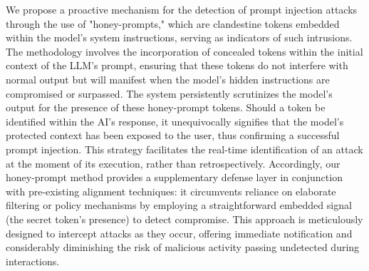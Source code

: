 \documentclass[manuscript,screen,review]{acmart}
\begin{document}
We propose a proactive mechanism for the detection of prompt injection attacks through the use of "honey-prompts," which are clandestine tokens embedded within the model's system instructions, serving as indicators of such intrusions. The methodology involves the incorporation of concealed tokens within the initial context of the LLM's prompt, ensuring that these tokens do not interfere with normal output but will manifest when the model's hidden instructions are compromised or surpassed. The system persistently scrutinizes the model's output for the presence of these honey-prompt tokens. Should a token be identified within the AI's response, it unequivocally signifies that the model's protected context has been exposed to the user, thus confirming a successful prompt injection. This strategy facilitates the real-time identification of an attack at the moment of its execution, rather than retrospectively. Accordingly, our honey-prompt method provides a supplementary defense layer in conjunction with pre-existing alignment techniques: it circumvents reliance on elaborate filtering or policy mechanisms by employing a straightforward embedded signal (the secret token's presence) to detect compromise. This approach is meticulously designed to intercept attacks as they occur, offering immediate notification and considerably diminishing the risk of malicious activity passing undetected during interactions.
\end{document}
